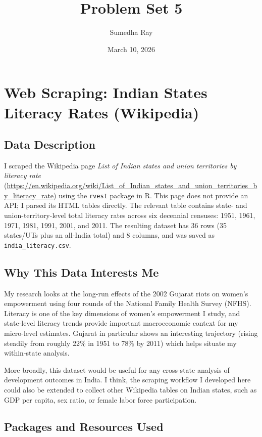 \documentclass[12pt]{article}
\title{\textbf{Problem Set 5}}
\author{Sumedha Ray}
\date{March 10, 2026}
\begin{document}
\maketitle

\section{Web Scraping: Indian States Literacy Rates (Wikipedia)}

\subsection*{Data Description}

I scraped the Wikipedia page \textit{List of Indian states and union territories by
literacy rate} (\url{https://en.wikipedia.org/wiki/List_of_Indian_states_and_union_territories_by_literacy_rate})
using the \texttt{rvest} package in R. This page does not provide an API; I parsed
its HTML tables directly. The relevant table contains state- and union-territory-level
total literacy rates across six decennial censuses: 1951, 1961, 1971, 1981, 1991,
2001, and 2011. The resulting dataset has 36 rows (35 states/UTs plus an all-India
total) and 8 columns, and was saved as \texttt{india\_literacy.csv}.

\subsection*{Why This Data Interests Me}

My research looks at the long-run effects of the 2002 Gujarat riots on women's
empowerment using four rounds of the National Family Health Survey (NFHS). Literacy
is one of the key dimensions of women's empowerment I study, and state-level literacy
trends provide important macroeconomic context for my micro-level estimates. Gujarat
in particular shows an interesting trajectory (rising steadily from roughly 22\% in
1951 to 78\% by 2011) which helps situate my within-state analysis.

More broadly, this dataset would be useful for any cross-state analysis of development
outcomes in India. I think, the scraping workflow I developed here could also be extended
to collect other Wikipedia tables on Indian states, such as GDP per capita, sex ratio,
or female labor force participation.

\subsection*{Packages and Resources Used}
\end{document}
